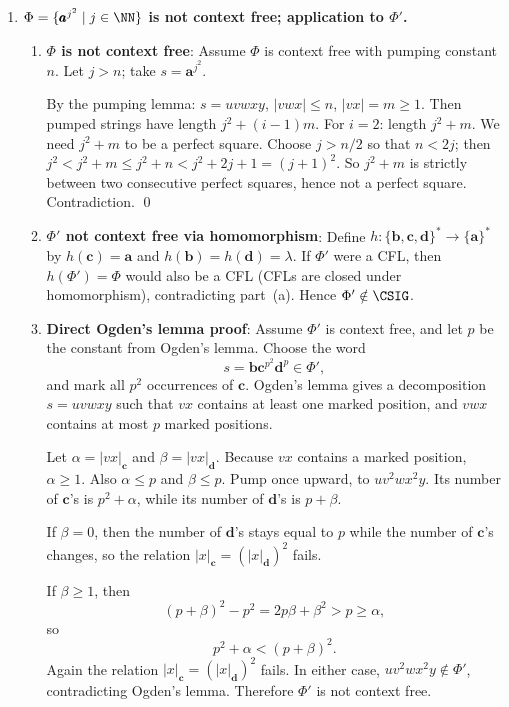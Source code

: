 \begin{enumerate}[{9.}1. ]
\item \textbf{$\Phi = \{\pmb{a}^{j^2} \mid j \in \NN\}$ is not context free; application to $\Phi'$.}

\begin{enumerate}
\item \textbf{$\Phi$ is not context free}: Assume $\Phi$ is context free with pumping constant $n$. Let $j > n$; take $s = \pmb{a}^{j^2}$.

By the pumping lemma: $s = uvwxy$, $|vwx| \leq n$, $|vx| = m \geq 1$. Then pumped strings have length $j^2 + (i-1)m$. For $i=2$: length $j^2 + m$. We need $j^2 + m$ to be a perfect square. Choose $j > n/2$ so that $n < 2j$; then $j^2 < j^2 + m \leq j^2 + n < j^2 + 2j + 1 = (j+1)^2$. So $j^2 + m$ is strictly between two consecutive perfect squares, hence not a perfect square. Contradiction. \qed

\item \textbf{$\Phi'$ not context free via homomorphism}: Define $h: \{\pmb{b},\pmb{c},\pmb{d}\}^* \to \{\pmb{a}\}^*$ by $h(\pmb{c}) = \pmb{a}$ and $h(\pmb{b}) = h(\pmb{d}) = \lambda$. If $\Phi'$ were a CFL, then $h(\Phi') = \Phi$ would also be a CFL (CFLs are closed under homomorphism), contradicting part~(a). Hence $\Phi' \notin \CSIG$.

\item \textbf{Direct Ogden's lemma proof}: Assume $\Phi'$ is context free, and
let $p$ be the constant from Ogden's lemma.  Choose the word
\[
s=\pmb{b}\pmb{c}^{p^2}\pmb{d}^p \in \Phi',
\]
and mark all $p^2$ occurrences of $\pmb{c}$.  Ogden's lemma gives a
decomposition $s=uvwxy$ such that $vx$ contains at least one marked position,
and $vwx$ contains at most $p$ marked positions.

Let $\alpha=|vx|_{\pmb{c}}$ and $\beta=|vx|_{\pmb{d}}$.  Because $vx$ contains a
marked position, $\alpha\geq 1$.  Also $\alpha\leq p$ and $\beta\leq p$.  Pump
once upward, to $uv^2wx^2y$.  Its number of $\pmb{c}$'s is $p^2+\alpha$, while
its number of $\pmb{d}$'s is $p+\beta$.

If $\beta=0$, then the number of $\pmb{d}$'s stays equal to $p$ while the
number of $\pmb{c}$'s changes, so the relation
$|x|_{\pmb{c}}=(|x|_{\pmb{d}})^2$ fails.

If $\beta\geq 1$, then
\[
(p+\beta)^2-p^2=2p\beta+\beta^2 > p \geq \alpha,
\]
so
\[
p^2+\alpha < (p+\beta)^2.
\]
Again the relation $|x|_{\pmb{c}}=(|x|_{\pmb{d}})^2$ fails.  In either case,
$uv^2wx^2y\notin\Phi'$, contradicting Ogden's lemma.  Therefore
$\Phi'$ is not context free.


\end{enumerate}
\end{enumerate}
